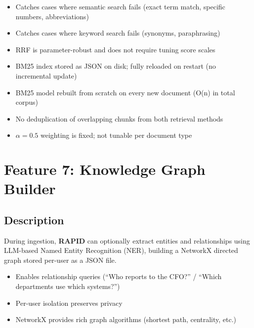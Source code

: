 \documentclass[12pt, a4paper, oneside]{report}
\newcommand{\rapidsys}{\textbf{\color{rapidblue}RAPID}}
\begin{document}
\begin{probox}[Benefits]
\begin{itemize}
  \item Catches cases where semantic search fails (exact term match, specific numbers, abbreviations)
  \item Catches cases where keyword search fails (synonyms, paraphrasing)
  \item RRF is parameter-robust and does not require tuning score scales
\end{itemize}
\end{probox}

\begin{conbox}[Drawbacks]
\begin{itemize}
  \item BM25 index stored as JSON on disk; fully reloaded on restart (no incremental update)
  \item BM25 model rebuilt from scratch on every new document (O(n) in total corpus)
  \item No deduplication of overlapping chunks from both retrieval methods
  \item $\alpha = 0.5$ weighting is fixed; not tunable per document type
\end{itemize}
\end{conbox}

\section{Feature 7: Knowledge Graph Builder}

\subsection*{Description}
During ingestion, \rapidsys{} can optionally extract entities and relationships using
LLM-based Named Entity Recognition (NER), building a NetworkX directed graph stored
per-user as a JSON file.

\begin{probox}[Benefits]
\begin{itemize}
  \item Enables relationship queries (``Who reports to the CFO?'' / ``Which departments use which systems?'')
  \item Per-user isolation preserves privacy
  \item NetworkX provides rich graph algorithms (shortest path, centrality, etc.)
\end{itemize}
\end{probox}
\end{document}
